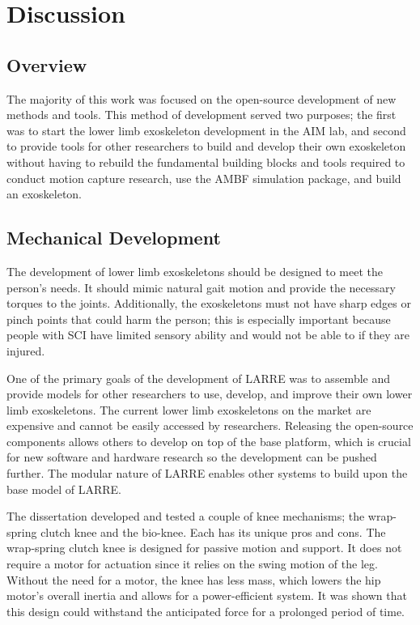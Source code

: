 \chapter{Discussion}

\section{Overview}

The majority of this work was focused on the open-source development of new methods and tools. This method of development served two purposes; the first was to start the lower limb exoskeleton development in the AIM lab, and second to provide tools for other researchers to build and develop their own exoskeleton without having to rebuild the fundamental building blocks and tools required to conduct motion capture research, use the AMBF simulation package, and build an exoskeleton. 

\section{Mechanical Development}

The development of lower limb exoskeletons should be designed to meet the person's needs. It should mimic natural gait motion and provide the necessary torques to the joints. Additionally, the exoskeletons must not have sharp edges or pinch points that could harm the person; this is especially important because people with SCI have limited sensory ability and would not be able to if they are injured. 

One of the primary goals of the development of LARRE was to assemble and provide models for other researchers to use, develop, and improve their own lower limb exoskeletons. The current lower limb exoskeletons on the market are expensive and cannot be easily accessed by researchers. Releasing the open-source components allows others to develop on top of the base platform, which is crucial for new software and hardware research so the development can be pushed further. The modular nature of LARRE enables other systems to build upon the base model of LARRE. 

The dissertation developed and tested a couple of knee mechanisms; the wrap-spring clutch knee and the bio-knee. Each has its unique pros and cons. The wrap-spring clutch knee is designed for passive motion and support. It does not require a motor for actuation since it relies on the swing motion of the leg. Without the need for a motor, the knee has less mass, which lowers the hip motor's overall inertia and allows for a power-efficient system. It was shown that this design could withstand the anticipated force for a prolonged period of time.   

